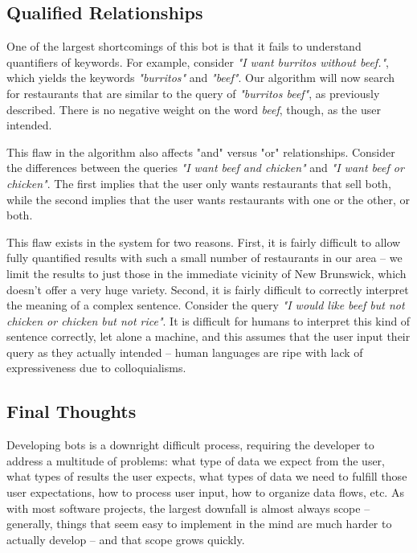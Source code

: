 \documentclass{article}
\begin{document}
    \subsection{Qualified Relationships}
        One of the largest shortcomings of this bot is that it fails to understand quantifiers of keywords. For example, consider \textit{"I want burritos 
without beef."}, which yields the keywords \textit{"burritos"} and \textit{"beef"}. Our algorithm will now search for restaurants that are similar to the query 
of \textit{"burritos beef"}, as previously described. There is no negative weight on the word \textit{beef}, though, as the user intended.
    
        This flaw in the algorithm also affects "and" versus "or" relationships. Consider the differences between the queries \textit{"I want beef and chicken"} 
and \textit{"I want beef or chicken"}. The first implies that the user only wants restaurants that sell both, while the second implies that the user wants 
restaurants with one or the other, or both.
        
        This flaw exists in the system for two reasons. First, it is fairly difficult to allow fully quantified results with such a small number of restaurants 
in our area -- we limit the results to just those in the immediate vicinity of New Brunswick, which doesn't offer a very huge variety. Second, it is fairly 
difficult to correctly interpret the meaning of a complex sentence. Consider the query \textit{"I would like beef but not chicken or chicken but not rice"}. It 
is difficult for humans to interpret this kind of sentence correctly, let alone a machine, and this assumes that the user input their query as they actually 
intended -- human languages are ripe with lack of expressiveness due to colloquialisms.

    \subsection{Final Thoughts}
        Developing bots is a downright difficult process, requiring the developer to address a multitude of problems: what type of data we expect from the user, 
what types of results the user expects, what types of data we need to fulfill those user expectations, how to process user input, how to organize data flows, 
etc. As with most software projects, the largest downfall is almost always scope -- generally, things that seem easy to implement in the mind are much harder to 
actually develop -- and that scope grows quickly. 
        
\end{document}

